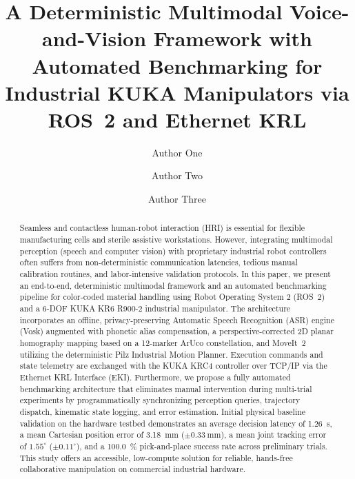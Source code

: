 \documentclass[runningheads]{llncs}
\begin{document}
\title{A Deterministic Multimodal Voice-and-Vision Framework with Automated Benchmarking for Industrial KUKA Manipulators via ROS~2 and Ethernet KRL}


\author{Author One \and
Author Two \and
Author Three}



\maketitle

\begin{abstract}
Seamless and contactless human-robot interaction (HRI) is essential for flexible manufacturing cells and sterile assistive workstations. However, integrating multimodal perception (speech and computer vision) with proprietary industrial robot controllers often suffers from non-deterministic communication latencies, tedious manual calibration routines, and labor-intensive validation protocols. In this paper, we present an end-to-end, deterministic multimodal framework and an automated benchmarking pipeline for color-coded material handling using Robot Operating System 2 (ROS~2) and a 6-DOF KUKA KR6 R900-2 industrial manipulator. The architecture incorporates an offline, privacy-preserving Automatic Speech Recognition (ASR) engine (Vosk) augmented with phonetic alias compensation, a perspective-corrected 2D planar homography mapping based on a 12-marker ArUco constellation, and MoveIt~2 utilizing the deterministic Pilz Industrial Motion Planner. Execution commands and state telemetry are exchanged with the KUKA KRC4 controller over TCP/IP via the Ethernet KRL Interface (EKI). Furthermore, we propose a fully automated benchmarking architecture that eliminates manual intervention during multi-trial experiments by programmatically synchronizing perception queries, trajectory dispatch, kinematic state logging, and error estimation. Initial physical baseline validation on the hardware testbed demonstrates an average decision latency of \SI{1.26}{\second}, a mean Cartesian position error of \SI{3.18}{\milli\meter} ($\pm\SI{0.33}{\milli\meter}$), a mean joint tracking error of $1.55^\circ$ ($\pm 0.11^\circ$), and a \SI{100.0}{\percent} pick-and-place success rate across preliminary trials. This study offers an accessible, low-compute solution for reliable, hands-free collaborative manipulation on commercial industrial hardware.

\end{abstract}
\end{document}
